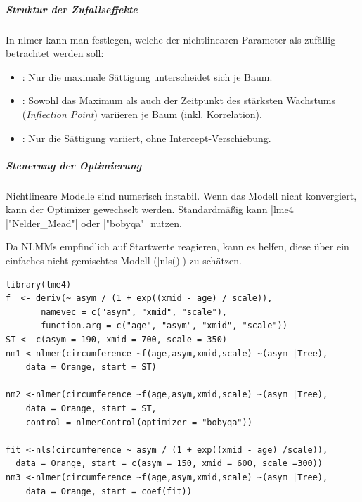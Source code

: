 \documentclass[10pt,twocolumn]{scrartcl}
\renewcommand{\lstinline}{\mycoloredinline}
\begin{document}
\subparagraph{Struktur der Zufallseffekte}

In nlmer kann man festlegen, welche der nichtlinearen Parameter als zufällig betrachtet werden soll:

\begin{itemize}
\item \lstinline{(asym | Tree)}: Nur die maximale Sättigung unterscheidet sich je Baum.
\item \lstinline{(asym + xmid | Tree)}: Sowohl das Maximum als auch der Zeitpunkt des stärksten Wachstums (\emph{Inflection Point}) variieren je Baum (inkl. Korrelation).
\item \lstinline{(asym + 0 | Tree)}: Nur die Sättigung variiert, ohne Intercept-Verschiebung.
\end{itemize}

\subparagraph{Steuerung der Optimierung}

Nichtlineare Modelle sind numerisch instabil. Wenn das Modell nicht konvergiert, kann der Optimizer gewechselt werden. Standardmäßig kann \lstinline|lme4| \lstinline|"Nelder_Mead"| oder \lstinline|"bobyqa"| nutzen.

Da NLMMs empfindlich auf Startwerte reagieren, kann es helfen, diese über ein einfaches nicht-gemischtes Modell (\lstinline|nls()|) zu schätzen.

\begin{lstlisting}
library(lme4)
f  <- deriv(~ asym / (1 + exp((xmid - age) / scale)),
       namevec = c("asym", "xmid", "scale"),
       function.arg = c("age", "asym", "xmid", "scale"))
ST <- c(asym = 190, xmid = 700, scale = 350)
nm1 <-nlmer(circumference ~f(age,asym,xmid,scale) ~(asym |Tree),
    data = Orange, start = ST)

nm2 <-nlmer(circumference ~f(age,asym,xmid,scale) ~(asym |Tree),
    data = Orange, start = ST,
    control = nlmerControl(optimizer = "bobyqa"))

fit <-nls(circumference ~ asym / (1 + exp((xmid - age) /scale)),
  data = Orange, start = c(asym = 150, xmid = 600, scale =300))
nm3 <-nlmer(circumference ~f(age,asym,xmid,scale) ~(asym |Tree),
    data = Orange, start = coef(fit))
\end{lstlisting}
\end{document}
